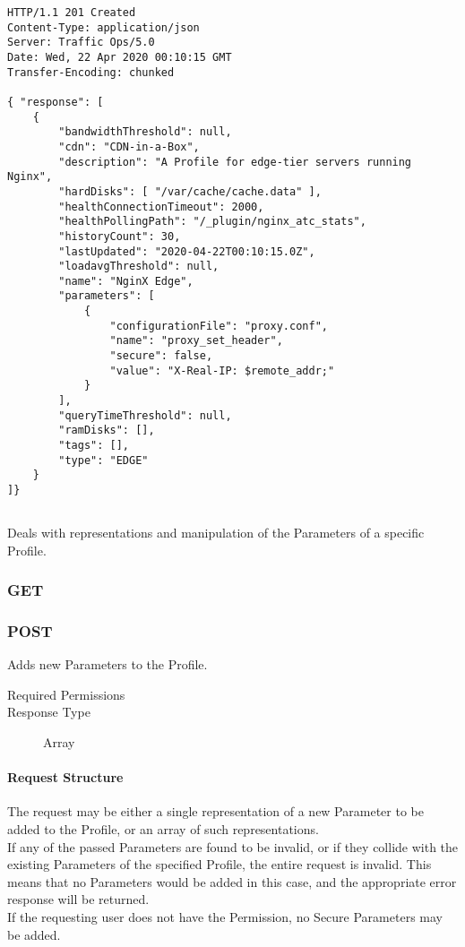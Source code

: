 \begin{codelisting}
\begin{verbatim}
HTTP/1.1 201 Created
Content-Type: application/json
Server: Traffic Ops/5.0
Date: Wed, 22 Apr 2020 00:10:15 GMT
Transfer-Encoding: chunked

{ "response": [
	{
		"bandwidthThreshold": null,
		"cdn": "CDN-in-a-Box",
		"description": "A Profile for edge-tier servers running Nginx",
		"hardDisks": [ "/var/cache/cache.data" ],
		"healthConnectionTimeout": 2000,
		"healthPollingPath": "/_plugin/nginx_atc_stats",
		"historyCount": 30,
		"lastUpdated": "2020-04-22T00:10:15.0Z",
		"loadavgThreshold": null,
		"name": "NginX Edge",
		"parameters": [
			{
				"configurationFile": "proxy.conf",
				"name": "proxy_set_header",
				"secure": false,
				"value": "X-Real-IP: $remote_addr;"
			}
		],
		"queryTimeThreshold": null,
		"ramDisks": [],
		"tags": [],
		"type": "EDGE"
	}
]}
\end{verbatim}
\end{codelisting}

\subsection{}

\subsection{}
Deals with representations and manipulation of the Parameters of a specific
Profile.

\subsubsection{GET}

\subsubsection{POST}
Adds new Parameters to the Profile.

\begin{description}
	\item[Required Permissions] 
	\item[Response Type] Array
\end{description}

\paragraph{Request Structure}
The request may be either a single representation of a new Parameter to be
added to the Profile, or an array of such representations.\\
If any of the passed Parameters are found to be invalid, or if they collide
with the existing Parameters of the specified Profile, the entire request is
invalid. This means that no Parameters would be added in this case, and the
appropriate error response will be returned.\\
If the requesting user does not have the  Permission,
no Secure Parameters may be added.

